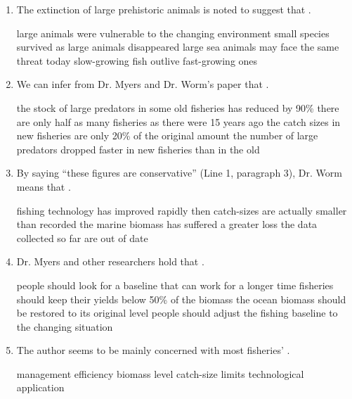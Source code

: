 \begin{enumerate}[resume]
	\item
The extinction of large prehistoric animals is noted to
suggest that \lineread.


\fourchoices
{large animals were vulnerable to the changing environment}
{small species survived as large animals disappeared}
{large sea animals may face the same threat today}
{slow-growing fish outlive fast-growing ones}


\item
We can infer from Dr. Myers and Dr. Worm's paper that
\lineread.


\fourchoices
{the stock of large predators in some old fisheries has reduced by 90\%}
{there are only half as many fisheries as there were 15 years ago}
{the catch sizes in new fisheries are only 20\% of the original amount}
{the number of large predators dropped faster in new fisheries than in the old}




\item
By saying ``these figures are conservative'' (Line 1,
paragraph 3), Dr. Worm means that \lineread.


\fourchoices
{fishing technology has improved rapidly}
{then catch-sizes are actually smaller than recorded}
{the marine biomass has suffered a greater loss}
{the data collected so far are out of date}



\item
Dr. Myers and other researchers hold that \lineread.


\fourchoices
{people should look for a baseline that can work for a longer time}
{fisheries should keep their yields below 50\% of the biomass}
{the ocean biomass should be restored to its original level}
{people should adjust the fishing baseline to the changing situation}



\item
The author seems to be mainly concerned with most fisheries'
\lineread.


\fourchoices
{management efficiency}
{biomass level}
{catch-size limits}
{technological application}

	
\end{enumerate}





